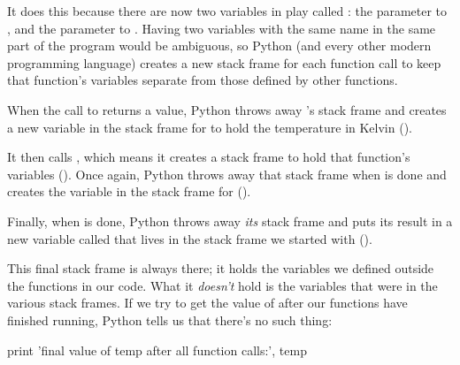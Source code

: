 It does this because there are now two variables in play called
: the parameter to , and the
parameter to . Having two variables with the
same name in the same part of the program would be ambiguous, so Python
(and every other modern programming language) creates a new stack frame
for each function call to keep that function's variables separate from
those defined by other functions.

When the call to  returns a value, Python
throws away 's stack frame and creates a new
variable in the stack frame for  to hold the
temperature in Kelvin ().



It then calls , which means it creates a
stack frame to hold that function's variables ().
Once again, Python throws away that stack frame when
 is done and creates the variable
 in the stack frame for 
().


Finally, when  is done, Python throws away
\emph{its} stack frame and puts its result in a new variable called
 that lives in the stack frame we started with ().


This final stack frame is always there; it holds the variables we
defined outside the functions in our code. What it \emph{doesn't} hold
is the variables that were in the various stack frames. If we try to get
the value of  after our functions have finished running,
Python tells us that there's no such thing:

\begin{VerbIn}
print 'final value of temp after all function calls:', temp
\end{VerbIn}

